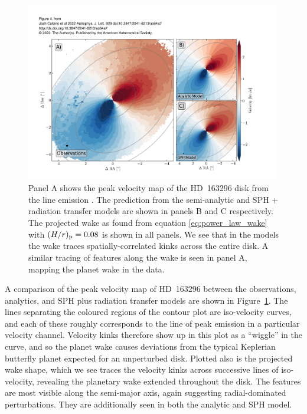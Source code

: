\begin{figure}
    \centering
    \includegraphics[width = 0.99\textwidth]{figures/calcino_v0.pdf}
    \caption{Panel A shows the peak velocity map of the HD~163296 disk from the line emission \citep{oberg2021}. The prediction from the semi-analytic and SPH + radiation transfer models are shown in panels B and C respectively. The projected wake as found from equation \ref{eq:power_law_wake} with $(H/r)_{\rm p}=0.08$ is shown in all panels. We see that in the models the wake traces spatially-correlated kinks across the entire disk. A similar tracing of features along the wake is seen in panel A, mapping the planet wake in the data.}
    \label{fig:calcino_v0}
\end{figure}

A comparison of the peak velocity map of HD~163296 between the observations, analytics, and SPH plus radiation transfer models are shown in Figure~\ref{fig:calcino_v0}.
The lines separating the coloured regions of the contour plot are iso-velocity curves, and each of these roughly corresponds to the line of peak emission in a particular velocity channel.
Velocity kinks therefore show up in this plot as a ``wiggle'' in the curve, and so the planet wake causes deviations from the typical Keplerian butterfly planet expected for an unperturbed disk.
Plotted also is the projected wake shape, which we see traces the velocity kinks across successive lines of iso-velocity, revealing the planetary wake extended throughout the disk. 
The features are most visible along the semi-major axis, again suggesting radial-dominated perturbations.
They are additionally seen in both the analytic and SPH model.

